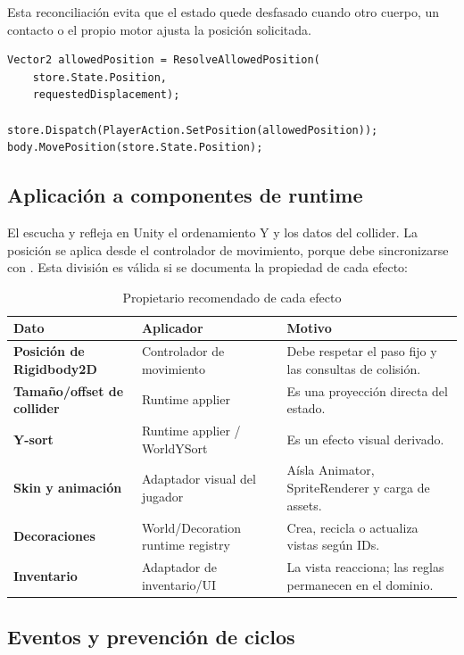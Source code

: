 Esta reconciliación evita que el estado quede desfasado cuando otro cuerpo, un contacto o el propio motor ajusta la posición solicitada.

\begin{lstlisting}[caption={Secuencia esencial implementada para el movimiento},label={lst:movement}]
Vector2 allowedPosition = ResolveAllowedPosition(
    store.State.Position,
    requestedDisplacement);

store.Dispatch(PlayerAction.SetPosition(allowedPosition));
body.MovePosition(store.State.Position);
\end{lstlisting}

\subsection{Aplicación a componentes de runtime}

El  escucha  y refleja en Unity el ordenamiento Y y los datos del collider. La posición se aplica desde el controlador de movimiento, porque debe sincronizarse con . Esta división es válida si se documenta la propiedad de cada efecto:

\begin{table}[H]
\centering
\caption{Propietario recomendado de cada efecto}
\begin{tabularx}{\textwidth}{>{\bfseries}p{3.3cm}p{4.2cm}X}
\toprule
Dato & Aplicador & Motivo \\
\midrule
Posición de Rigidbody2D & Controlador de movimiento & Debe respetar el paso fijo y las consultas de colisión. \\
Tamaño/offset de collider & Runtime applier & Es una proyección directa del estado. \\
Y-sort & Runtime applier / WorldYSort & Es un efecto visual derivado. \\
Skin y animación & Adaptador visual del jugador & Aísla Animator, SpriteRenderer y carga de assets. \\
Decoraciones & World/Decoration runtime registry & Crea, recicla o actualiza vistas según IDs. \\
Inventario & Adaptador de inventario/UI & La vista reacciona; las reglas permanecen en el dominio. \\
\bottomrule
\end{tabularx}
\end{table}

\subsection{Eventos y prevención de ciclos}

